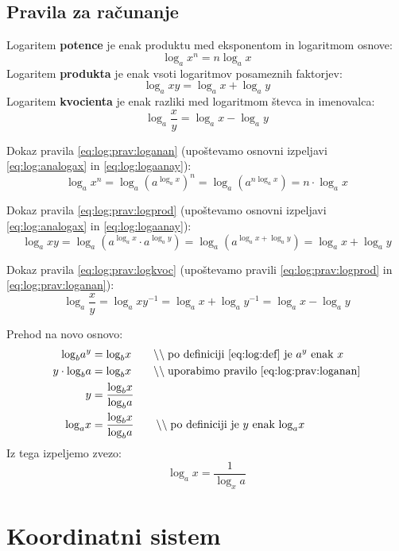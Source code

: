 \documentclass[a4paper,oneside,12pt,fleqn]{article}
\newcommand\krat\cdot
\newcommand{\comment}[1]{\ensuremath{\qquad\backslash\backslash\;}\textnormal{#1}}
\numberwithin{equation}{section}
\begin{document}
\subsection{Pravila za računanje}
\label{sec:eq:log:prav}
Logaritem \textbf{potence} je enak produktu med eksponentom in logaritmom osnove:
\begin{equation}
  \log_a\! x^n = n\log_a\! x \label{eq:log:prav:loganan}
\end{equation}
Logaritem \textbf{produkta} je enak vsoti logaritmov posameznih faktorjev:
\begin{equation}
  \log_a\! xy = \log_a\!x+ \log_a\!y \label{eq:log:prav:logprod}
\end{equation}
Logaritem \textbf{kvocienta} je enak razliki med logaritmom števca in imenovalca:
\begin{equation}
  \log_a\!\frac{x}{y} = \log_a\!x-\log_a\!y \label{eq:log:prav:logkvoc}
\end{equation}

Dokaz pravila \ref{eq:log:prav:loganan} (upoštevamo osnovni izpeljavi \eqref{eq:log:analogax} in
\eqref{eq:log:logaanay}):
\[ \log_a\!x^n = \log_a\!\left( a^{\log_a\!x} \right)^n = \log_a\!\left( a^{n\log_a\!x}
\right) = n \krat \log_a\!x  \]

Dokaz pravila \ref{eq:log:prav:logprod} (upoštevamo osnovni izpeljavi \eqref{eq:log:analogax} in
\eqref{eq:log:logaanay}):
\[ \log_a\!xy = \log_a\!\left( a^{\log_a\!x} \krat a^{\log_a\!y} \right) = \log_a\!\left(
a^{\log_a\!x+\log_a\!y} \right) = \log_a\!x + \log_a\!y \]

Dokaz pravila \ref{eq:log:prav:logkvoc} (upoštevamo pravili \eqref{eq:log:prav:logprod}  in
\eqref{eq:log:prav:loganan}):
\[ \log_a\!\frac{x}{y} = \log_a\!xy^{-1} = \log_a\!x + \log_a\!y^{-1} = \log_a\!x -
\log_a\!y \]

Prehod na novo osnovo:
\begin{align*}
  \log_b\!a^y &= \log_b\!x \comment{po definiciji \eqref{eq:log:def} je $a^y$ enak $x$} \\
  y \krat \log_b\!a &= \log_b\!x \comment{uporabimo pravilo \eqref{eq:log:prav:loganan}} \\
  y &= \frac{\log_b\!x}{\log_b\!a} \\
  \log_a\!x &= \frac{\log_b\!x}{\log_b\!a} \comment{po definiciji je $y$ enak $\log_a\!x$}
\end{align*}
Iz tega izpeljemo zvezo:
\[ \log_a\!x = \frac{1}{\log_x\!a} \]

\section{Koordinatni sistem}
\label{sec:koor}
\end{document}
